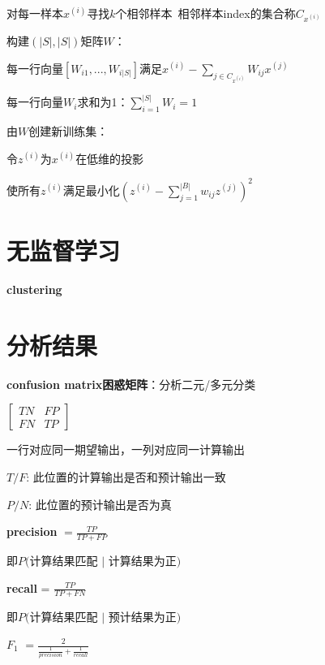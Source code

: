 \documentclass[UTF8]{ctexart}
\begin{document}
  \quad 对每一样本$x^{(i)}$寻找$k$个相邻样本\ 相邻样本index的集合称$C_{x^{(i)}}$
  
  \quad 构建$(|S|, |S|)$矩阵$W$：
  
  \quad \quad 每一行向量$[W_{i1}, ..., W_{i|S|}]$满足$x^{(i)} - \sum_{j \in C_{x^{(i)}}} W_{ij}x^{(j)}$
  
  \quad \quad 每一行向量$W_i$求和为1：$\sum_{i=1}^{|S|}W_i = 1$

  \quad 由$W$创建新训练集：

  \quad \quad 令$z^{(i)}$为$x^{(i)}$在低维的投影

  \quad \quad 使所有$z^{(i)}$满足最小化$(z^{(i)} - \sum_{j=1}^{|B|}w_{ij}z^{(j)})^2$

\section{无监督学习}
\noindent \textbf{clustering}

  


\section{分析结果}
\noindent \textbf{confusion matrix困惑矩阵}：分析二元/多元分类
  
  $\begin{bmatrix}
    TN & FP \\
    FN & TP
  \end{bmatrix}$

  一行对应同一期望输出，一列对应同一计算输出

  $T/F$: 此位置的计算输出是否和预计输出一致

  $P/N$: 此位置的预计输出是否为真

  \textbf{precision} $= \frac{TP}{TP + FP}$

  \quad 即$P($计算结果匹配 $|$ 计算结果为正$)$

  \textbf{recall} = $\frac{TP}{TP + FN}$

  \quad 即$P($计算结果匹配 $|$ 预计结果为正$)$

  \textbf{$F_1$} $= \frac{2}{\frac{1}{precision} + \frac{1}{recall}}$ 
  
\end{document}
